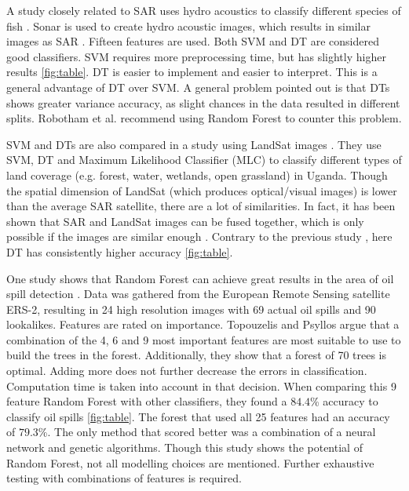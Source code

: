 A study closely related to SAR uses hydro acoustics to classify different species of fish \cite{Robotham2011170}. Sonar is used to create hydro acoustic images, which results in similar images as SAR \cite{griffiths2003synthetic}. Fifteen features are used. Both SVM and DT are considered good classifiers. SVM requires more preprocessing time, but has slightly higher results \ref{fig:table}. DT is easier to implement and easier to interpret. This is a general advantage of DT over SVM. A general problem pointed out is that DTs shows greater variance accuracy, as slight chances in the data resulted in different splits. Robotham et al. recommend using Random Forest to counter this problem.

SVM and DTs are also compared in a study using LandSat images \cite{Otukei2010S27}. They use SVM, DT and Maximum Likelihood Classifier (MLC) to classify different types of land coverage (e.g. forest, water, wetlands, open grassland) in Uganda. Though the spatial dimension of LandSat (which produces optical/visual images) is lower than the average SAR satellite, there are a lot of similarities. In fact, it has been shown that SAR and LandSat images can be fused together, which is only possible if the images are similar enough \cite{dupas2000sar}. Contrary to the previous study \cite{Robotham2011170}, here DT has consistently higher accuracy \ref{fig:table}.

One study shows that Random Forest can achieve great results in the area of oil spill detection \cite{Topouzelis201268}. Data was gathered from the European Remote Sensing satellite ERS-2, resulting in 24 high resolution images with 69 actual oil spills and 90 lookalikes. Features are rated on importance. Topouzelis and Psyllos argue that a combination of the 4, 6 and 9 most important features \cite{topouzelis2003oil} are most suitable to use to build the trees in the forest. Additionally, they show that a forest of 70 trees is optimal. Adding more does not further decrease the errors in classification. Computation time is taken into account in that decision. When comparing this 9 feature Random Forest with other classifiers, they found a $84.4$\% accuracy to classify oil spills \ref{fig:table}. The forest that used all 25 features had an accuracy of $79.3$\%. The only method that scored better was a combination of a neural network and genetic algorithms. Though this study shows the potential of Random Forest, not all modelling choices are mentioned. Further exhaustive testing with combinations of features is required.

